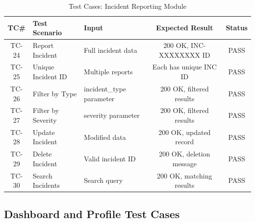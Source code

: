 \begin{table}[H]
  \centering
  \caption{Test Cases: Incident Reporting Module}
  \label{tab:tc-incident}
  \begin{tabularx}{\textwidth}{@{}c l X c c@{}}
    \toprule
    \textbf{TC\#} & \textbf{Test Scenario} & \textbf{Input} & \textbf{Expected Result} & \textbf{Status} \\
    \midrule
    TC-24 & Report Incident & Full incident data & 200 OK, INC-XXXXXXXX ID & \textcolor{green!70!black}{PASS} \\
    TC-25 & Unique Incident ID & Multiple reports & Each has unique INC ID & \textcolor{green!70!black}{PASS} \\
    TC-26 & Filter by Type & incident\_type parameter & 200 OK, filtered results & \textcolor{green!70!black}{PASS} \\
    TC-27 & Filter by Severity & severity parameter & 200 OK, filtered results & \textcolor{green!70!black}{PASS} \\
    TC-28 & Update Incident & Modified data & 200 OK, updated record & \textcolor{green!70!black}{PASS} \\
    TC-29 & Delete Incident & Valid incident ID & 200 OK, deletion message & \textcolor{green!70!black}{PASS} \\
    TC-30 & Search Incidents & Search query & 200 OK, matching results & \textcolor{green!70!black}{PASS} \\
    \bottomrule
  \end{tabularx}
\end{table}

\subsection{Dashboard and Profile Test Cases}

